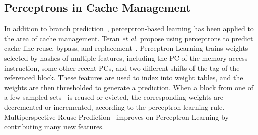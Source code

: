 \subsection{Perceptrons in Cache Management}

In addition to branch prediction~\cite{PerceptronPredictor},
perceptron-based learning has been applied to the area of cache
management.  Teran \textit{et al.} propose using perceptrons to
predict cache line reuse, bypass, and replacement~\cite{Perc_Reuse}.
Perceptron Learning trains weights selected by hashes of multiple
features, including the PC of the memory access instruction, some
other recent PCs, and two different shifts of the tag of the
referenced block. These features are used to index into weight tables,
and the weights are then thresholded to generate a prediction. When a
block from one of a few sampled sets~\cite{sdbp} is reused or evicted,
the corresponding weights are decremented or incremented, according to
the perceptron learning rule. Multiperspective Reuse
Prediction~\cite{Multiperspective} improves on Perceptron Learning by
contributing many new features. 
